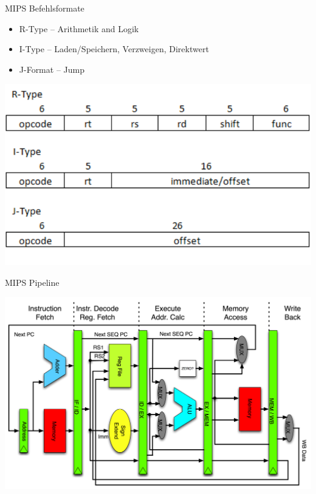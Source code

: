 \begin{frame}{MIPS Befehlsformate}
\begin{itemize}
		\item R-Type -- Arithmetik and Logik
       \item I-Type -- Laden/Speichern, Verzweigen, Direktwert
       \item J-Format -- Jump
\end{itemize}

\begin{center}
\includegraphics[keepaspectratio=true,width=0.83\paperwidth]{instruction-formats.png}
\end{center}
\end{frame}

\begin{frame}{MIPS Pipeline}

\begin{center}

\includegraphics[keepaspectratio=true,width=0.83\paperwidth]{pipeline.png}
\end{center}


\end{frame}

